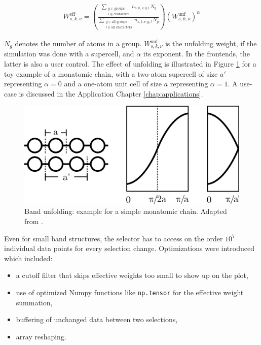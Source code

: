 \begin{align}
  W^{\text{eff}}_{s,k,\nu} = \left( \frac{\sum\limits_{\substack{g \in \text{groups} \\ l \in \text{characters}}} n_{s,k,\nu,g,l}\, N_g}{\sum\limits_{\substack{g \in \text{all groups} \\ l \in \text{all characters}}} n_{s,k,\nu,g,l}\, N_g} \right) \left(W_{s,k,\nu}^{\text{unf}}\right)^\alpha
\label{eq:effective-weight}
\end{align}

\(N_g\) denotes the number of atoms in a group. \(W_{s,k,\nu}^{\text{unf}}\) is
the unfolding weight, if the simulation was done with a supercell, and
\(\alpha\) its exponent. In the frontends, the latter is also a user control.
The effect of unfolding is illustrated in Figure \ref{fig:unfolding} for a toy
example of a monatomic chain, with a two-atom supercell of size \(a'\)
representing \(\alpha=0\) and a one-atom unit cell of size \(a\) representing
\(\alpha=1\). A use-case is discussed in the Application Chapter
\ref{chap:applications}.

\begin{figure}[htb!]
    \centering
    \includegraphics[width=0.6\linewidth]{fig/unfolding.png}
    \caption[Band Unfolding]{Band unfolding: example for a simple monatomic
      chain. Adapted from \cite{hoffmann1987chemistry}.}
    \label{fig:unfolding}
\end{figure}

Even for small band structures, the selector has to access on the order \(10^7\)
individual data points for every selection change. Optimizations were introduced
which included:
\begin{itemize}
\item a cutoff filter that skips effective weights too small to show up on the
    plot,
\item use of optimized Numpy functions like \texttt{np.tensor} for the
    effective weight summation,
\item buffering of unchanged data between two selections,
\item array reshaping.
\end{itemize}


